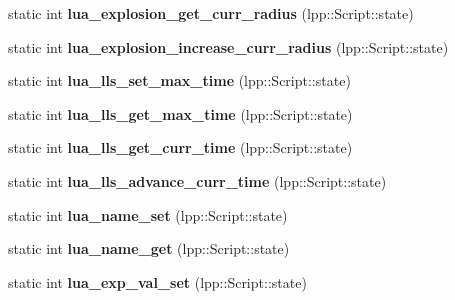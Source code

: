 \begin{DoxyCompactItemize}
\item 
static int {\bfseries lua\+\_\+explosion\+\_\+get\+\_\+curr\+\_\+radius} (lpp\+::\+Script\+::state)\hypertarget{class_lua_interface_a9a66ac62f506a704576c15077fab7d29}{}\label{class_lua_interface_a9a66ac62f506a704576c15077fab7d29}

\item 
static int {\bfseries lua\+\_\+explosion\+\_\+increase\+\_\+curr\+\_\+radius} (lpp\+::\+Script\+::state)\hypertarget{class_lua_interface_a6e84455dc5bb2b23814dc33bcebf9475}{}\label{class_lua_interface_a6e84455dc5bb2b23814dc33bcebf9475}

\item 
static int {\bfseries lua\+\_\+lls\+\_\+set\+\_\+max\+\_\+time} (lpp\+::\+Script\+::state)\hypertarget{class_lua_interface_a14358b547c667f4d36a062212bdccd52}{}\label{class_lua_interface_a14358b547c667f4d36a062212bdccd52}

\item 
static int {\bfseries lua\+\_\+lls\+\_\+get\+\_\+max\+\_\+time} (lpp\+::\+Script\+::state)\hypertarget{class_lua_interface_a94ebc6bf558ce2669b23b13a419f0632}{}\label{class_lua_interface_a94ebc6bf558ce2669b23b13a419f0632}

\item 
static int {\bfseries lua\+\_\+lls\+\_\+get\+\_\+curr\+\_\+time} (lpp\+::\+Script\+::state)\hypertarget{class_lua_interface_a41c533d054f58e1755abab3938f9d441}{}\label{class_lua_interface_a41c533d054f58e1755abab3938f9d441}

\item 
static int {\bfseries lua\+\_\+lls\+\_\+advance\+\_\+curr\+\_\+time} (lpp\+::\+Script\+::state)\hypertarget{class_lua_interface_a0d6e5fb1321d113ecc27e2022d6a50b5}{}\label{class_lua_interface_a0d6e5fb1321d113ecc27e2022d6a50b5}

\item 
static int {\bfseries lua\+\_\+name\+\_\+set} (lpp\+::\+Script\+::state)\hypertarget{class_lua_interface_a46cbe8a6930104586ed7a5d65276d45d}{}\label{class_lua_interface_a46cbe8a6930104586ed7a5d65276d45d}

\item 
static int {\bfseries lua\+\_\+name\+\_\+get} (lpp\+::\+Script\+::state)\hypertarget{class_lua_interface_a2b288ddb0b3e85c54d963c32bb4ae0ab}{}\label{class_lua_interface_a2b288ddb0b3e85c54d963c32bb4ae0ab}

\item 
static int {\bfseries lua\+\_\+exp\+\_\+val\+\_\+set} (lpp\+::\+Script\+::state)\hypertarget{class_lua_interface_a6e46abfa244986c3c578f44fef783b0b}{}\label{class_lua_interface_a6e46abfa244986c3c578f44fef783b0b}


\end{DoxyCompactItemize}
